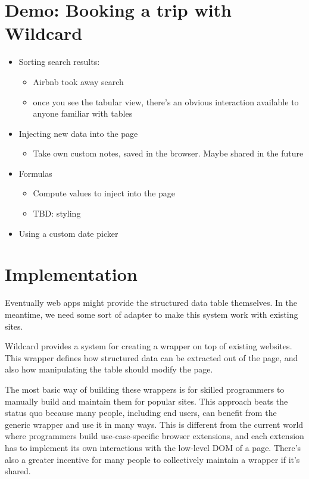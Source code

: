 \documentclass[english,submission]{programming}
\providecommand{\tightlist}{%
  \setlength{\itemsep}{0pt}\setlength{\parskip}{0pt}}
\begin{document}
\hypertarget{demo-booking-a-trip-with-wildcard}{%
\section{Demo: Booking a trip with
Wildcard}\label{demo-booking-a-trip-with-wildcard}}

\begin{itemize}
\tightlist
\item
  Sorting search results:

  \begin{itemize}
  \tightlist
  \item
    Airbnb took away search
  \item
    once you see the tabular view, there's an obvious interaction
    available to anyone familiar with tables
  \end{itemize}
\item
  Injecting new data into the page

  \begin{itemize}
  \tightlist
  \item
    Take own custom notes, saved in the browser. Maybe shared in the
    future
  \end{itemize}
\item
  Formulas

  \begin{itemize}
  \tightlist
  \item
    Compute values to inject into the page
  \item
    TBD: styling
  \end{itemize}
\item
  Using a custom date picker
\end{itemize}

\hypertarget{implementation}{%
\section{Implementation}\label{implementation}}

Eventually web apps might provide the structured data table themselves.
In the meantime, we need some sort of adapter to make this system work
with existing sites.

Wildcard provides a system for creating a wrapper on top of existing
websites. This wrapper defines how structured data can be extracted out
of the page, and also how manipulating the table should modify the page.

The most basic way of building these wrappers is for skilled programmers
to manually build and maintain them for popular sites. This approach
beats the status quo because many people, including end users, can
benefit from the generic wrapper and use it in many ways. This is
different from the current world where programmers build
use-case-specific browser extensions, and each extension has to
implement its own interactions with the low-level DOM of a page. There's
also a greater incentive for many people to collectively maintain a
wrapper if it's shared.
\end{document}
